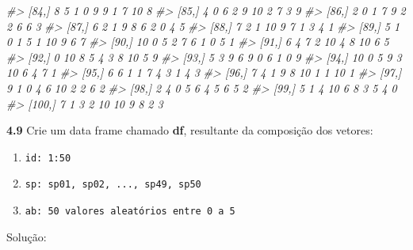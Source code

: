 \documentclass[
]{book}
\newenvironment{Shaded}{\begin{snugshade}}{\end{snugshade}}
\newcommand{\CommentTok}[1]{\textcolor[rgb]{0.56,0.35,0.01}{\textit{#1}}}
\providecommand{\tightlist}{%
  \setlength{\itemsep}{0pt}\setlength{\parskip}{0pt}}
\begin{document}
\begin{Shaded}
\begin{Highlighting}[]
\CommentTok{\#\textgreater{}  [84,]    8    5    1    0    9    9    1    7   10     8}
\CommentTok{\#\textgreater{}  [85,]    4    0    6    2    9   10    2    7    3     9}
\CommentTok{\#\textgreater{}  [86,]    2    0    1    7    9    2    2    6    6     3}
\CommentTok{\#\textgreater{}  [87,]    6    2    1    9    8    6    2    0    4     5}
\CommentTok{\#\textgreater{}  [88,]    7    2    1   10    9    7    1    3    4     1}
\CommentTok{\#\textgreater{}  [89,]    5    1    0    1    5    1   10    9    6     7}
\CommentTok{\#\textgreater{}  [90,]   10    0    5    2    7    6    1    0    5     1}
\CommentTok{\#\textgreater{}  [91,]    6    4    7    2   10    4    8   10    6     5}
\CommentTok{\#\textgreater{}  [92,]    0   10    8    5    4    3    8   10    5     9}
\CommentTok{\#\textgreater{}  [93,]    5    3    9    6    9    0    6    1    0     9}
\CommentTok{\#\textgreater{}  [94,]   10    0    5    9    3   10    6    4    7     1}
\CommentTok{\#\textgreater{}  [95,]    6    6    1    1    7    4    3    1    4     3}
\CommentTok{\#\textgreater{}  [96,]    7    4    1    9    8   10    1    1   10     1}
\CommentTok{\#\textgreater{}  [97,]    9    1    0    4    6   10    2    2    6     2}
\CommentTok{\#\textgreater{}  [98,]    2    4    0    5    6    4    5    6    5     2}
\CommentTok{\#\textgreater{}  [99,]    5    1    4   10    6    8    3    5    4     0}
\CommentTok{\#\textgreater{} [100,]    7    1    3    2   10   10    9    8    2     3}
\end{Highlighting}
\end{Shaded}

\textbf{4.9}
Crie um data frame chamado \textbf{df}, resultante da composição dos vetores:

\begin{enumerate}
\def\labelenumi{\arabic{enumi}.}
\tightlist
\item
  \texttt{id:\ 1:50}
\item
  \texttt{sp:\ sp01,\ sp02,\ ...,\ sp49,\ sp50}
\item
  \texttt{ab:\ 50\ valores\ aleatórios\ entre\ 0\ a\ 5}
\end{enumerate}

Solução:
\end{document}
